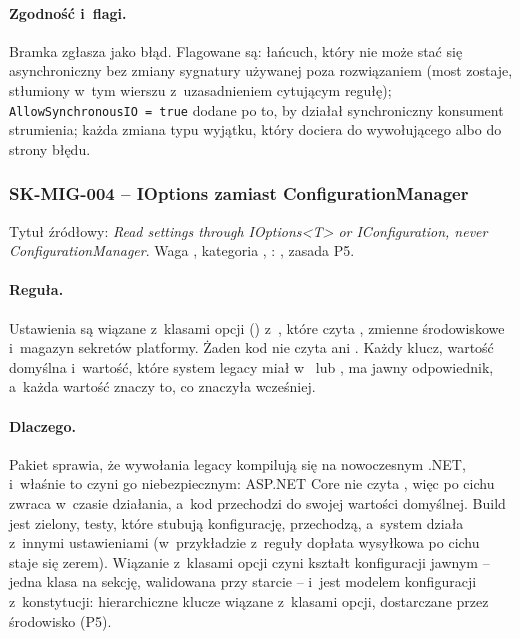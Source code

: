 \paragraph{Zgodność i~flagi.} Bramka zgłasza  jako
błąd. Flagowane są: łańcuch, który nie może stać się asynchroniczny bez zmiany sygnatury
używanej poza rozwiązaniem (most zostaje, stłumiony w~tym wierszu z~uzasadnieniem cytującym
regułę); \texttt{AllowSynchronousIO = true} dodane po to, by działał synchroniczny
konsument strumienia; każda zmiana typu wyjątku, który dociera do wywołującego albo do
strony błędu.


\subsubsection{SK-MIG-004 -- IOptions zamiast ConfigurationManager}\label{sec:standardy-sk-mig-004}

Tytuł źródłowy: \emph{Read settings through IOptions<T> or IConfiguration, never
ConfigurationManager}. Waga , kategoria ,
: , zasada P5.

\paragraph{Reguła.} Ustawienia są wiązane z~klasami opcji ()
z~, które czyta , zmienne środowiskowe
i~magazyn sekretów platformy. Żaden kod nie czyta
 ani
. Każdy klucz, wartość domyślna i~wartość, które
system legacy miał w~ lub , ma jawny odpowiednik,
a~każda wartość znaczy to, co znaczyła wcześniej.

\paragraph{Dlaczego.} Pakiet  sprawia, że
wywołania legacy kompilują się na nowoczesnym .NET, i~właśnie to czyni go niebezpiecznym:
ASP.NET Core nie czyta , więc
 po cichu zwraca
 w~czasie działania, a~kod przechodzi do swojej wartości domyślnej. Build jest
zielony, testy, które stubują konfigurację, przechodzą, a~system działa z~innymi
ustawieniami (w~przykładzie z~reguły dopłata wysyłkowa po cichu staje się zerem). Wiązanie
z~klasami opcji czyni kształt konfiguracji jawnym -- jedna klasa na sekcję, walidowana przy
starcie -- i~jest modelem konfiguracji z~konstytucji: hierarchiczne klucze wiązane z~klasami
opcji, dostarczane przez środowisko (P5).

